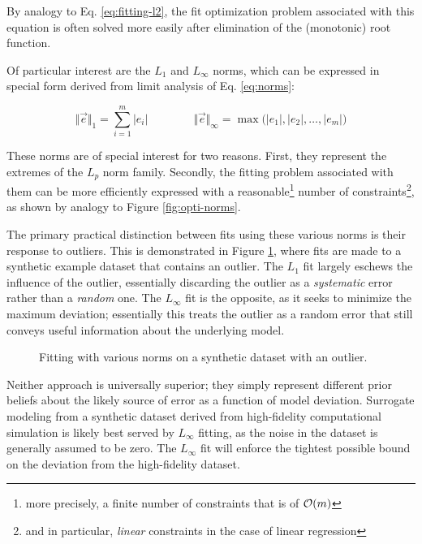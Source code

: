 \noindent
By analogy to Eq. \ref{eq:fitting-l2}, the fit optimization problem associated with this equation is often solved more easily after elimination of the (monotonic) root function.

Of particular interest are the $L_1$ and $L_\infty$ norms, which can be expressed in special form derived from limit analysis of Eq. \ref{eq:norms}:

\begin{equation*}
    \big\Vert \vec{e} \big\Vert _1      = \sum_{i=1}^m |e_i|
    \qquad\qquad
    \big\Vert \vec{e} \big\Vert _\infty = \max\big(|e_1|, |e_2|, \dots, |e_m|\big)
\end{equation*}

\noindent
These norms are of special interest for two reasons. First, they represent the extremes of the $L_p$ norm family. Secondly, the fitting problem associated with them can be more efficiently expressed with a reasonable\footnote{more precisely, a finite number of constraints that is of $\mathcal{O}(m)$} number of constraints\footnote{and in particular, \textit{linear} constraints in the case of linear regression}, as shown by analogy to Figure \ref{fig:opti-norms}.

The primary practical distinction between fits using these various norms is their response to outliers. This is demonstrated in Figure \ref{fig:fitting-norm}, where fits are made to a synthetic example dataset that contains an outlier. The $L_1$ fit largely eschews the influence of the outlier, essentially discarding the outlier as a \textit{systematic} error rather than a \textit{random} one. The $L_\infty$ fit is the opposite, as it seeks to minimize the maximum deviation; essentially this treats the outlier as a random error that still conveys useful information about the underlying model.

\begin{figure}[H]
    \centering
%    
    \ifdraft{}{}
    \caption{Fitting with various norms on a synthetic dataset with an outlier.}
    \label{fig:fitting-norm}
\end{figure}

Neither approach is universally superior; they simply represent different prior beliefs about the likely source of error as a function of model deviation. Surrogate modeling from a synthetic dataset derived from high-fidelity computational simulation is likely best served by $L_\infty$ fitting, as the noise in the dataset is generally assumed to be zero. The $L_\infty$ fit will enforce the tightest possible bound on the deviation from the high-fidelity dataset.

